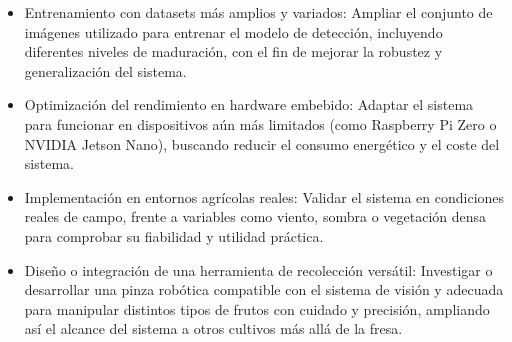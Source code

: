 \begin{itemize}
    \item Entrenamiento con datasets más amplios y variados: Ampliar el conjunto de imágenes utilizado para entrenar el modelo de detección, incluyendo diferentes %
    niveles de maduración, con el fin de mejorar la robustez y generalización del sistema.
    \item Optimización del rendimiento en hardware embebido: Adaptar el sistema para funcionar en dispositivos aún más limitados (como Raspberry Pi Zero o NVIDIA Jetson Nano), buscando reducir el consumo energético y el coste del sistema.
    \item Implementación en entornos agrícolas reales: Validar el sistema en condiciones reales de campo, frente a variables como viento, sombra o vegetación densa para comprobar su fiabilidad y utilidad práctica.
    \item Diseño o integración de una herramienta de recolección versátil: Investigar o desarrollar una pinza robótica compatible con el sistema de visión y adecuada para manipular distintos tipos de frutos con cuidado y precisión, ampliando así el alcance del sistema a otros cultivos más allá de la fresa. 
\end{itemize}
